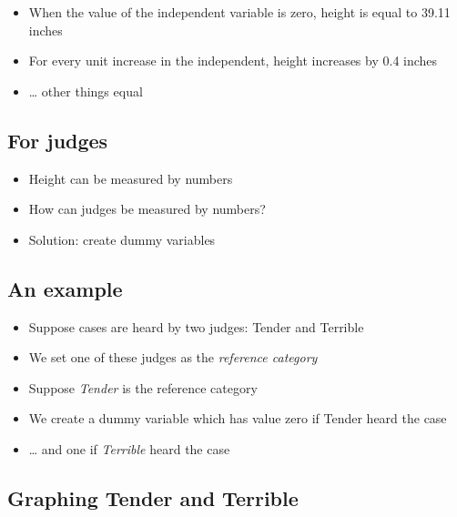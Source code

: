 \documentclass[12pt,twoside]{article}
\providecommand{\tightlist}{%
  \setlength{\itemsep}{0pt}\setlength{\parskip}{0pt}}
\begin{document}
\begin{itemize}
\tightlist
\item
  When the value of the independent variable is zero, height is equal to
  39.11 inches
\item
  For every unit increase in the independent, height increases by 0.4
  inches
\item
  \ldots{} other things equal
\end{itemize}

\subsection{For judges}\label{for-judges}

\begin{itemize}
\tightlist
\item
  Height can be measured by numbers
\item
  How can judges be measured by numbers?
\item
  Solution: create dummy variables
\end{itemize}

\subsection{An example}\label{an-example}

\begin{itemize}
\tightlist
\item
  Suppose cases are heard by two judges: Tender and Terrible
\item
  We set one of these judges as the \emph{reference category}
\item
  Suppose \emph{Tender} is the reference category
\item
  We create a dummy variable which has value zero if Tender heard the
  case
\item
  \ldots{} and one if \emph{Terrible} heard the case
\end{itemize}

\subsection{Graphing Tender and
Terrible}\label{graphing-tender-and-terrible}
\end{document}
